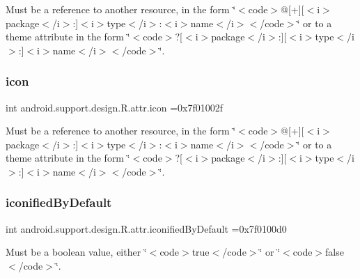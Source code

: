 Must be a reference to another resource, in the form \char`\"{}$<$code$>$@\mbox{[}+\mbox{]}\mbox{[}$<$i$>$package$<$/i$>$\+:\mbox{]}$<$i$>$type$<$/i$>$\+:$<$i$>$name$<$/i$>$$<$/code$>$\char`\"{} or to a theme attribute in the form \char`\"{}$<$code$>$?\mbox{[}$<$i$>$package$<$/i$>$\+:\mbox{]}\mbox{[}$<$i$>$type$<$/i$>$\+:\mbox{]}$<$i$>$name$<$/i$>$$<$/code$>$\char`\"{}. \mbox{\label{classandroid_1_1support_1_1design_1_1R_1_1attr_a4f038778976a3c5a21ca334ebe58357d}} 
\subsubsection{\texorpdfstring{icon}{icon}}
{\footnotesize\ttfamily int android.\+support.\+design.\+R.\+attr.\+icon =0x7f01002f\hspace{0.3cm}{\ttfamily [static]}}

Must be a reference to another resource, in the form \char`\"{}$<$code$>$@\mbox{[}+\mbox{]}\mbox{[}$<$i$>$package$<$/i$>$\+:\mbox{]}$<$i$>$type$<$/i$>$\+:$<$i$>$name$<$/i$>$$<$/code$>$\char`\"{} or to a theme attribute in the form \char`\"{}$<$code$>$?\mbox{[}$<$i$>$package$<$/i$>$\+:\mbox{]}\mbox{[}$<$i$>$type$<$/i$>$\+:\mbox{]}$<$i$>$name$<$/i$>$$<$/code$>$\char`\"{}. \mbox{\label{classandroid_1_1support_1_1design_1_1R_1_1attr_a6e1cf27cdba92453a20269f73165859b}} 
\subsubsection{\texorpdfstring{iconified\+By\+Default}{iconifiedByDefault}}
{\footnotesize\ttfamily int android.\+support.\+design.\+R.\+attr.\+iconified\+By\+Default =0x7f0100d0\hspace{0.3cm}{\ttfamily [static]}}

Must be a boolean value, either \char`\"{}$<$code$>$true$<$/code$>$\char`\"{} or \char`\"{}$<$code$>$false$<$/code$>$\char`\"{}. 

